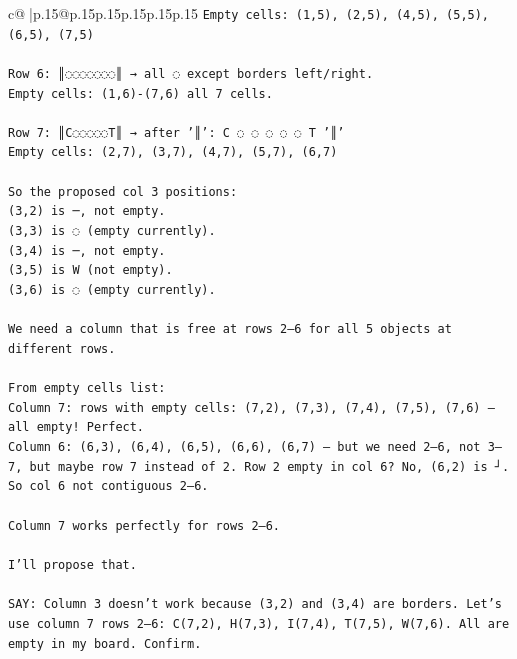 \documentclass{article}
\begin{document}
{\begin{supertabular}{c@{$\;$}|p{.15\linewidth}@{}p{.15\linewidth}p{.15\linewidth}p{.15\linewidth}p{.15\linewidth}p{.15\linewidth}}
{{{\texttt{Empty cells: (1,5), (2,5), (4,5), (5,5), (6,5), (7,5)} \\
\\ 
\texttt{Row 6: ║◌◌◌◌◌◌◌║ → all ◌ except borders left/right.  } \\
\texttt{Empty cells: (1,6){-}(7,6) all 7 cells.} \\
\\ 
\texttt{Row 7: ║C◌◌◌◌◌T║ → after '║': C ◌ ◌ ◌ ◌ ◌ T '║'  } \\
\texttt{Empty cells: (2,7), (3,7), (4,7), (5,7), (6,7)} \\
\\ 
\texttt{So the proposed col 3 positions:  } \\
\texttt{(3,2) is ─, not empty.  } \\
\texttt{(3,3) is ◌ (empty currently).  } \\
\texttt{(3,4) is ─, not empty.  } \\
\texttt{(3,5) is W (not empty).  } \\
\texttt{(3,6) is ◌ (empty currently).} \\
\\ 
\texttt{We need a column that is free at rows 2–6 for all 5 objects at different rows.} \\
\\ 
\texttt{From empty cells list:  } \\
\texttt{Column 7: rows with empty cells: (7,2), (7,3), (7,4), (7,5), (7,6) — all empty! Perfect.  } \\
\texttt{Column 6: (6,3), (6,4), (6,5), (6,6), (6,7) — but we need 2–6, not 3–7, but maybe row 7 instead of 2. Row 2 empty in col 6? No, (6,2) is ┘. So col 6 not contiguous 2–6.} \\
\\ 
\texttt{Column 7 works perfectly for rows 2–6.} \\
\\ 
\texttt{I'll propose that.} \\
\\ 
\texttt{SAY: Column 3 doesn't work because (3,2) and (3,4) are borders. Let's use column 7 rows 2–6: C(7,2), H(7,3), I(7,4), T(7,5), W(7,6). All are empty in my board. Confirm.} \\
            }
        }
    }
     \\ \\


\end{supertabular}}
\end{document}

